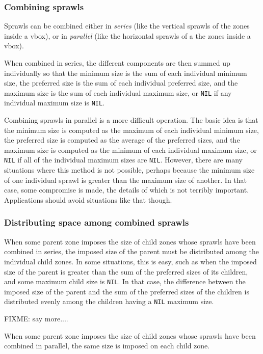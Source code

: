 \documentclass{report}
\begin{document}
\subsubsection{Combining sprawls}

Sprawls can be combined either in \emph{series} (like the vertical
sprawls of the zones inside a vbox), or in \emph{parallel} (like the
horizontal sprawls of a the zones inside a vbox).  

When combined in series, the different components are then summed up
individually so that the minimum size is the sum of each individual
minimum size, the preferred size is the sum of each individual
preferred size, and the maximum size is the sum of each individual
maximum size, or \texttt{NIL} if any individual maximum size is
\texttt{NIL}.

Combining sprawls in parallel is a more difficult operation.  The
basic idea is that the minimum size is computed as the maximum of each
individual minimum size, the preferred size is computed as the average
of the preferred sizes, and the maximum size is computed as the
minimum of each individual maximum size, or \texttt{NIL} if all of the
individual maximum sizes are \texttt{NIL}.  However, there are many
situations where this method is not possible, perhaps because the
minimum size of one individual sprawl is greater than the maximum size
of another.  In that case, some compromise is made, the details of
which is not terribly important.  Applications should avoid situations
like that though. 

\subsubsection{Distributing space among combined sprawls}

When some parent zone imposes the size of child zones whose sprawls
have been combined in series, the imposed size of the parent must be
distributed among the individual child zones.  In some situations,
this is easy, such as when the imposed size of the parent is greater
than the sum of the preferred sizes of its children, and some maximum
child size is \texttt{NIL}.  In that case, the difference between the
imposed size of the parent and the sum of the preferred sizes of the
children is distributed evenly among the children having a
\texttt{NIL} maximum size.

FIXME: say more....

When some parent zone imposes the size of child zones whose sprawls
have been combined in parallel, the same size is imposed on each child
zone.
\end{document}
